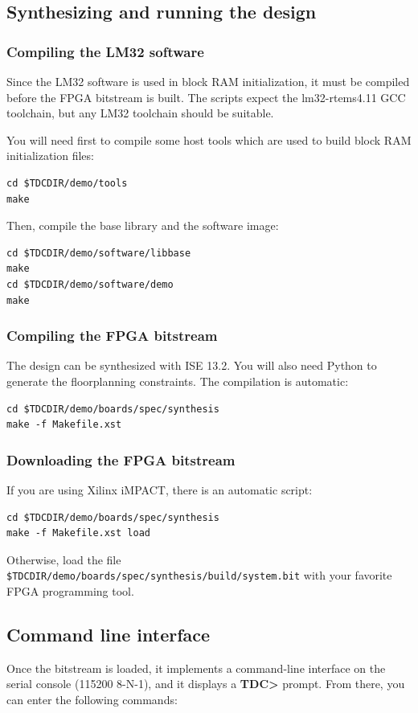 \documentclass[a4paper,11pt]{article}
\begin{document}
\subsection{Synthesizing and running the design}
\subsubsection{Compiling the LM32 software}
Since the LM32 software is used in block RAM initialization, it must be compiled before the FPGA bitstream is built. The scripts expect the lm32-rtems4.11 GCC toolchain, but any LM32 toolchain should be suitable.

You will need first to compile some host tools which are used to build block RAM initialization files:
\begin{verbatim}
cd $TDCDIR/demo/tools
make
\end{verbatim}

Then, compile the base library and the software image:
\begin{verbatim}
cd $TDCDIR/demo/software/libbase
make
cd $TDCDIR/demo/software/demo
make
\end{verbatim}

\subsubsection{Compiling the FPGA bitstream}
The design can be synthesized with ISE 13.2. You will also need Python to generate the floorplanning constraints. The compilation is automatic:
\begin{verbatim}
cd $TDCDIR/demo/boards/spec/synthesis
make -f Makefile.xst
\end{verbatim}

\subsubsection{Downloading the FPGA bitstream}
If you are using Xilinx iMPACT, there is an automatic script:
\begin{verbatim}
cd $TDCDIR/demo/boards/spec/synthesis
make -f Makefile.xst load
\end{verbatim}

Otherwise, load the file \verb!$TDCDIR/demo/boards/spec/synthesis/build/system.bit! with your favorite FPGA programming tool.

\subsection{Command line interface}
Once the bitstream is loaded, it implements a command-line interface on the serial console (115200 8-N-1), and it displays a \textbf{TDC>} prompt. From there, you can enter the following commands:
\end{document}

